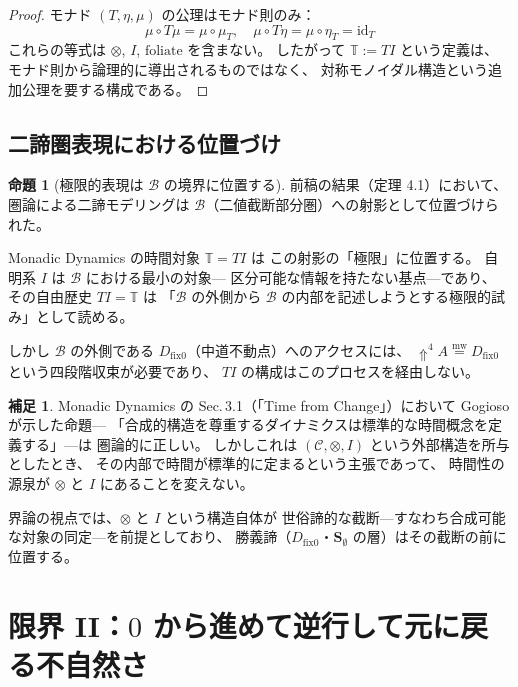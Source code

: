 \documentclass[11pt,a4paper]{ltjsarticle}
\newcommand{\mweq}{\mathrel{\overset{\mathrm{mw}}{=}}}
\newcommand{\dfix}{D_{\mathrm{fix}0}}
\newcommand{\metanegation}{\Uparrow}
\newcommand{\Svoid}{\mathbf{S}_{\emptyset}}
\newcommand{\Bval}{\mathcal{B}}
\theoremstyle{definition}
\newtheorem{proposition}{命題}[section]
\newtheorem{scholium}{補足}[section]
\begin{document}
\begin{proof}
モナド $(T, \eta, \mu)$ の公理はモナド則のみ：
\[
\mu \circ T\mu = \mu \circ \mu_T, \quad
\mu \circ T\eta = \mu \circ \eta_T = \mathrm{id}_T
\]
これらの等式は $\otimes$, $I$, $\mathrm{foliate}$ を含まない。
したがって $\mathbb{T} := TI$ という定義は、
モナド則から論理的に導出されるものではなく、
対称モノイダル構造という追加公理を要する構成である。
\end{proof}

\subsection{二諦圏表現における位置づけ}

\begin{proposition}[極限的表現は $\Bval$ の境界に位置する]
前稿の結果（定理 4.1）において、圏論による二諦モデリングは
$\Bval$（二値截断部分圏）への射影として位置づけられた。

Monadic Dynamics の時間対象 $\mathbb{T} = TI$ は
この射影の「極限」に位置する。
自明系 $I$ は $\Bval$ における最小の対象---
区分可能な情報を持たない基点---であり、
その自由歴史 $TI = \mathbb{T}$ は
「$\Bval$ の外側から $\Bval$ の内部を記述しようとする極限的試み」として読める。

しかし $\Bval$ の外側である $\dfix$（中道不動点）へのアクセスには、
$\metanegation^4 A \mweq \dfix$ という四段階収束が必要であり、
$TI$ の構成はこのプロセスを経由しない。
\end{proposition}

\begin{scholium}
Monadic Dynamics の Sec.\,3.1（「Time from Change」）において
Gogioso が示した命題---
「合成的構造を尊重するダイナミクスは標準的な時間概念を定義する」---は
圏論的に正しい。
しかしこれは $(\mathcal{C}, \otimes, I)$ という外部構造を所与としたとき、
その内部で時間が標準的に定まるという主張であって、
時間性の源泉が $\otimes$ と $I$ にあることを変えない。

界論の視点では、$\otimes$ と $I$ という構造自体が
世俗諦的な截断---すなわち合成可能な対象の同定---を前提としており、
勝義諦（$\dfix$・$\Svoid$ の層）はその截断の前に位置する。
\end{scholium}

\section{限界 II：$0$ から進めて逆行して元に戻る不自然さ}
\end{document}
